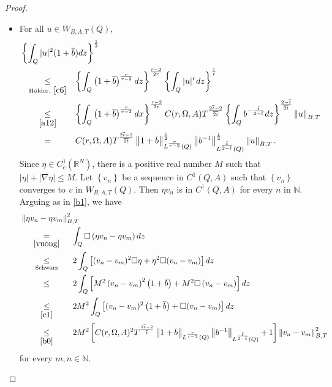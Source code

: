 \documentclass[11pt, a4paper]{article}
\numberwithin{equation}{section}
\newcommand{\coex}[2][\hphantom{longexplanation}]{%
  \underset{{#1}}{\overset{\hphantom{longexplanation}}{#2}}
}
\newcommand{\vuong}{\square}
\newcommand{\NN}{{\mathbb N}}
\newcommand{\RR}{{\mathbb R}}
\newcommand{\norm}[1]{\left\lVert #1\right\rVert}
\begin{document}
\begin{proof}
\begin{itemize}[wide]
\item[$(iii)$] For all $u\in
      W_{B,A,T}(Q),$
  \begin{align}   \label{b0}
    \begin{split}
      &\left\{\int_{Q}|u|^{2}(1+\overline{b})dz\right\}^{\frac{1}{2}}\\
      &\coex[\text{H\"older},~ \eqref{c6}]{\le}  \left\{\int_{Q} \left(1+\overline{b} \right)^{\frac{r}{r-2}}dz\right\}^{\frac{r-2}{2r}}\left\{\int_{Q}|u|^{r}dz\right\}^{\frac{1}{r}}
\\
&\coex[\eqref{a12}]{\le}\left\{\int_{Q} \left(1+\overline{b} \right)^{\frac{r}{r-2}}dx\right\}^{\frac{r-2}{2r}}C(r,\Omega,A)T^{\frac{2\overline{t}-2}{\overline{2t}}}\left\{\int_{Q}
  b^{-\frac{\bar{t}}{2-\bar{t}}}dz\right\}^{\frac{2-\overline{t}}{\overline{2t}}}\norm{u}_{B,T}\\
      &\coex{=}
        C(r,\Omega,A)T^{\frac{2\overline{t}-2}{\overline{2t}}}\norm{1
        + \bar{b}}_{L^{\frac{r}{r-2}}(Q)}^{\frac{1}{2}}
        \norm{b^{-1}}_{L^{\frac{\bar{t}}{2-\bar{t}}}(Q)}^{\frac{1}{2}} \norm{u}_{B,T}.
    \end{split}
  \end{align}
Since $\eta\in C^{1}_{c}(\RR^{N})$, there is a positive real number $M$ such that $|\eta|+|\nabla \eta|\le M $. Let  $\left\{v_{n}\right\}$ be a sequence in $C^{1}(Q,A)$ such that $\left\{v_{n}\right\}$ converges to $v$ in $W_{B,A,T}(Q)$. Then $\eta v_{n}$ is in  $C^{1}(Q,A)$ for every $n$ in $\NN$. Arguing as in \eqref{b1}, we have
 \begin{align*}
   &\norm{\eta v_{n}- \eta v_{m}}_{B,T}^{2}\\
   &\coex[\eqref{vuong}]{=}
     \int_{Q}\vuong \left(\eta v_{n}- \eta v_{m} \right)dz \\
   &\coex[\text{Schwarz}]{\le} 2\int_{Q} \left[(v_{n}-v_{m})^{2}\vuong \eta +
     \eta^{2}\vuong (v_{n}-  v_{m}) \right]dz\\
   &\coex{\le}2 \int_{Q} \left[M^{2} \left(v_{n}-v_{m} \right)^{2} \left(1
     +\overline{b} \right)+ M^{2}\vuong \left(v_{n}-  v_{m} \right)
     \right]dz\\
   &\coex[\eqref{c1}]{\le}
     2M^{2}\int_{Q} \left[(v_{n}-v_{m})^{2} \left(1+\overline{b} \right) + \vuong (v_{n}-
     v_{m}) \right]dz\\
   &\coex[\eqref{b0}]{\le} 2M^{2} \left[C(r,\Omega,A)^{2}T^{\frac{2\overline{t}-2}{\overline{t}}}\norm{1
        + \bar{b}}_{L^{\frac{r}{r-2}}(Q)}
        \norm{b^{-1}}_{L^{\frac{\bar{t}}{2-\bar{t}}}(Q)} +1 \right]\norm{v_{n}-v_{m}}^{2}_{B,T}
 \end{align*}
 for every $m,n\in\NN$.
 

\end{itemize}
\end{proof}
\end{document}
